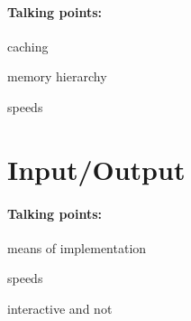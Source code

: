 \paragraph{Talking points:}
\begin{aenumerate}
\item caching
\item memory hierarchy
\item speeds
\end{aenumerate}

\section{Input/Output}
\paragraph{Talking points:}
\begin{aenumerate}
\item means of implementation
\item speeds
\item interactive and not
\end{aenumerate}